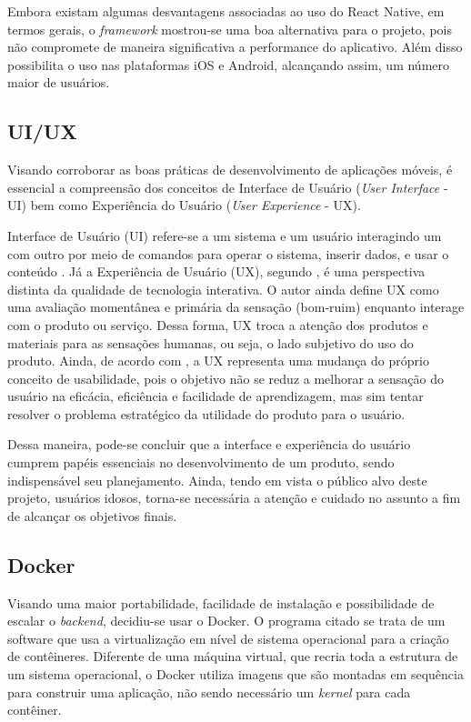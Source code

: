 Embora existam algumas desvantagens associadas ao uso do React Native, em termos gerais, o \textit{framework} mostrou-se uma boa alternativa para o projeto, pois não compromete de maneira significativa a performance do aplicativo. Além disso possibilita o uso nas plataformas iOS e Android, alcançando assim, um número maior de usuários.

\subsection{UI/UX}
Visando corroborar as boas práticas de desenvolvimento de aplicações móveis, é essencial a compreensão dos conceitos de Interface de Usuário (\textit{User Interface} - UI) bem como Experiência do Usuário (\textit{User Experience} - UX). %

Interface de Usuário (UI) refere-se a um sistema e um usuário interagindo um com outro por meio de comandos para operar o sistema, inserir dados, e usar o conteúdo \citep{joo2015}. Já a Experiência de Usuário (UX), segundo \cite{marc2008}, é uma perspectiva distinta da qualidade de tecnologia interativa. O autor ainda define UX como uma avaliação momentânea e primária da sensação (bom-ruim) enquanto interage com o produto ou serviço. Dessa forma, UX troca a atenção dos produtos e materiais para as sensações humanas, ou seja, o lado subjetivo do uso do produto. Ainda, de acordo com \cite{castilla2017}, a UX representa uma mudança do próprio conceito de usabilidade, pois o objetivo não se reduz a melhorar a sensação do usuário na eficácia, eficiência e facilidade de aprendizagem, mas sim tentar resolver o problema estratégico da utilidade do produto para o usuário. 

Dessa maneira, pode-se concluir que a interface e experiência do usuário cumprem papéis essenciais no desenvolvimento de um produto, sendo indispensável seu planejamento. Ainda, tendo em vista o público alvo deste projeto, usuários idosos, torna-se necessária a atenção e cuidado no assunto a fim de alcançar os objetivos finais.

\subsection{Docker}
Visando uma maior portabilidade, facilidade de instalação e possibilidade de escalar o \textit{backend}, decidiu-se usar o Docker.
O programa citado se trata de um software que usa a virtualização em nível de sistema operacional para a criação de contêineres. Diferente de uma máquina virtual, que recria toda a estrutura de um sistema operacional, o Docker utiliza imagens que são montadas em sequência para construir uma aplicação, não sendo necessário um \textit{kernel} para cada contêiner.

